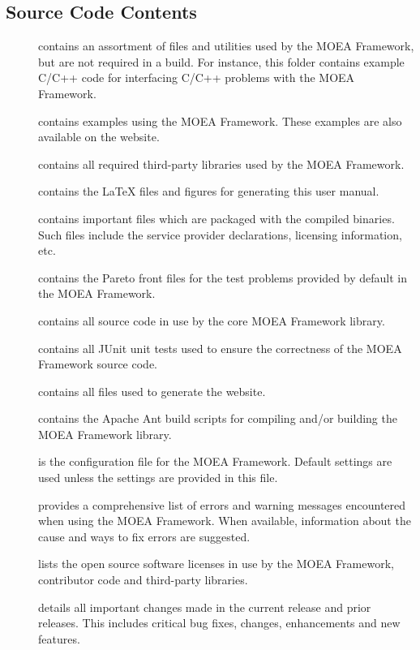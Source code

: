 \subsection{Source Code Contents}
\begin{description}
  \item[] contains an assortment of files and utilities used by the MOEA Framework, but are not required in a build.  For instance, this folder contains example C/C++ code for interfacing C/C++ problems with the MOEA Framework.
  \item[] contains examples using the MOEA Framework.  These examples are also available on the website.
  \item[] contains all required third-party libraries used by the MOEA Framework.
  \item[] contains the LaTeX files and figures for generating this user manual.
  \item[] contains important files which are packaged with the compiled binaries.  Such files include the service provider declarations, licensing information, etc.
  \item[] contains the Pareto front files for the test problems provided by default in the MOEA Framework.
  \item[] contains all source code in use by the core MOEA Framework library.
  \item[] contains all JUnit unit tests used to ensure the correctness of the MOEA Framework source code.
  \item[] contains all files used to generate the website.
  \item[] contains the Apache Ant build scripts for compiling and/or building the MOEA Framework library.
  \item[] is the configuration file for the MOEA Framework.  Default settings are used unless the settings are provided in this file.
  \item[] provides a comprehensive list of errors and warning messages encountered when using the MOEA Framework.  When available, information about the cause and ways to fix errors are suggested.
  \item[] lists the open source software licenses in use by the MOEA Framework, contributor code and third-party libraries.
  \item[] details all important changes made in the current release and prior releases.  This includes critical bug fixes, changes, enhancements and new features.

\end{description}
